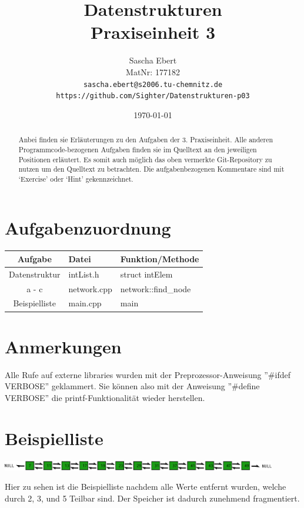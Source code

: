 \documentclass{article}
\title{Datenstrukturen\\Praxiseinheit 3}
\author
{
	Sascha Ebert\\
	MatNr: 177182\\
	\texttt{sascha.ebert@s2006.tu-chemnitz.de}\\
	\texttt{https://github.com/Sighter/Datenstrukturen-p03}\\
}
\date{\today}
\begin{document}
\maketitle

\begin{abstract}
Anbei finden sie Erläuterungen zu den Aufgaben der 3. Praxiseinheit.
Alle anderen Programmcode-bezogenen Aufgaben finden sie im Quelltext an den jeweiligen Positionen
erläutert. Es somit auch möglich das oben vermerkte Git-Repository zu nutzen um den Quelltext
zu betrachten. Die aufgabenbezogenen Kommentare sind mit `Exercise' oder `Hint' gekennzeichnet.
\end{abstract}

\section*{Aufgabenzuordnung}
\begin{tabular}{ c l l }
  Aufgabe & Datei & Funktion/Methode\\
  \hline
  Datenstruktur & intList.h & struct intElem\\
  a - c  & network.cpp & network::find\_node\\
  Beispielliste  & main.cpp & main
\end{tabular}

\section*{Anmerkungen}
Alle Rufe auf externe libraries wurden mit der Preprozessor-Anweisung ''\#ifdef VERBOSE'' geklammert.
Sie können also mit der Anweisung ''\#define VERBOSE'' die printf-Funktionalität wieder herstellen.

\newpage
\section*{Beispielliste}
\includegraphics[width=12cm]{structure}

Hier zu sehen ist die Beispielliste nachdem alle Werte entfernt wurden, welche durch 2, 3, und 5 Teilbar sind.
Der Speicher ist dadurch zunehmend fragmentiert.
\end{document}
